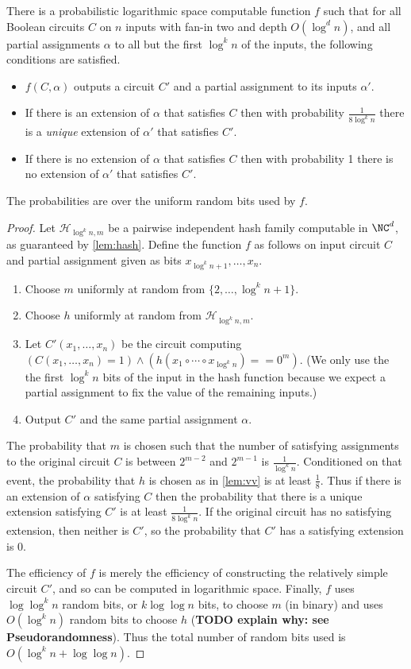 \documentclass{article}
\begin{document}
\begin{theorem}
  There is a probabilistic logarithmic space computable function $f$ such that for all Boolean circuits $C$ on $n$ inputs with fan-in two and depth $O(\log^d n)$, and all partial assignments $\alpha$ to all but the first $\log^k n$ of the inputs, the following conditions are satisfied.
  \begin{itemize}
  \item $f(C, \alpha)$ outputs a circuit $C'$ and a partial assignment to its inputs $\alpha'$.
  \item If there is an extension of $\alpha$ that satisfies $C$ then with probability $\frac{1}{8 \log^k n}$ there is a \emph{unique} extension of $\alpha'$ that satisfies $C'$.
  \item If there is no extension of $\alpha$ that satisfies $C$ then with probability 1 there is no extension of $\alpha'$ that satisfies $C'$.
  \end{itemize}
  The probabilities are over the uniform random bits used by $f$.
\end{theorem}
\begin{proof}
  Let $\mathcal{H}_{\log^k n, m}$ be a pairwise independent hash family computable in $\NC^d$, as guaranteed by \autoref{lem:hash}.
  Define the function $f$ as follows on input circuit $C$ and partial assignment given as bits $x_{\log^k n + 1}, \dotsc, x_n$.
  \begin{enumerate}
  \item Choose $m$ uniformly at random from $\{2, \dotsc, \log^k n + 1\}$.
  \item Choose $h$ uniformly at random from $\mathcal{H}_{\log^k n, m}$.
  \item
    Let $C'(x_1, \dotsc, x_n)$ be the circuit computing $(C(x_1, \dotsc, x_n) = 1) \land (h(x_1 \circ \dotsb \circ x_{\log^k n}) == 0^m)$.
    (We only use the the first $\log^k n$ bits of the input in the hash function because we expect a partial assignment to fix the value of the remaining inputs.)
  \item Output $C'$ and the same partial assignment $\alpha$.
  \end{enumerate}
  The probability that $m$ is chosen such that the number of satisfying assignments to the original circuit $C$ is between $2^{m - 2}$ and $2^{m - 1}$ is $\frac{1}{\log^k n}$.
  Conditioned on that event, the probability that $h$ is chosen as in \autoref{lem:vv} is at least $\frac{1}{8}$.
  Thus if there is an extension of $\alpha$ satisfying $C$ then the probability that there is a unique extension satisfying $C'$ is at least $\frac{1}{8 \log^k n}$.
  If the original circuit has no satisfying extension, then neither is $C'$, so the probability that $C'$ has a satisfying extension is 0.

  The efficiency of $f$ is merely the efficiency of constructing the relatively simple circuit $C'$, and so can be computed in logarithmic space.
  Finally, $f$ uses $\log \log^k n$ random bits, or $k \log \log n$ bits, to choose $m$ (in binary) and uses $O(\log^k n)$ random bits to choose $h$ (\textbf{TODO explain why: see Pseudorandomness}).
  Thus the total number of random bits used is $O(\log^k n + \log \log n)$.
\end{proof}
\end{document}
